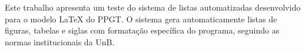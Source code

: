 Este trabalho apresenta um teste do sistema de listas automatizadas desenvolvido para o modelo LaTeX do PPGT. O sistema gera automaticamente listas de figuras, tabelas e siglas com formatação específica do programa, seguindo as normas institucionais da UnB.